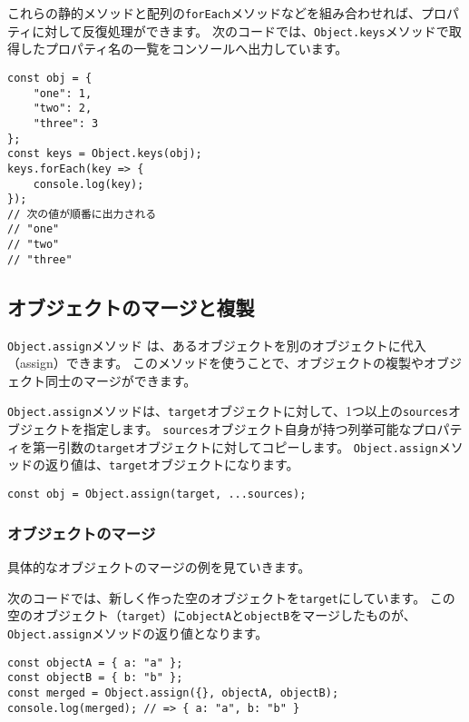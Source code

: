 これらの静的メソッドと配列の\texttt{forEach}メソッドなどを組み合わせれば、プロパティに対して反復処理ができます。
次のコードでは、\texttt{Object.keys}メソッドで取得したプロパティ名の一覧をコンソールへ出力しています。

\begin{lstlisting}
const obj = {
    "one": 1,
    "two": 2,
    "three": 3
};
const keys = Object.keys(obj);
keys.forEach(key => {
    console.log(key);
});
// 次の値が順番に出力される
// "one"
// "two"
// "three"
\end{lstlisting}

\hypertarget{copy-and-merge}{%
\subsection{オブジェクトのマージと複製}\label{copy-and-merge}}

\texttt{Object.assign}メソッド\,\protect{}\,は、あるオブジェクトを別のオブジェクトに代入（assign）できます。
このメソッドを使うことで、オブジェクトの複製やオブジェクト同士のマージができます。

\texttt{Object.assign}メソッドは、\texttt{target}オブジェクトに対して、1つ以上の\texttt{sources}オブジェクトを指定します。
\texttt{sources}オブジェクト自身が持つ列挙可能なプロパティを第一引数の\texttt{target}オブジェクトに対してコピーします。
\texttt{Object.assign}メソッドの返り値は、\texttt{target}オブジェクトになります。

\begin{lstlisting}
const obj = Object.assign(target, ...sources);
\end{lstlisting}

\hypertarget{merge}{%
\subsubsection{オブジェクトのマージ}\label{merge}}

具体的なオブジェクトのマージの例を見ていきます。

次のコードでは、新しく作った空のオブジェクトを\texttt{target}にしています。
この空のオブジェクト（\texttt{target}）に\texttt{objectA}と\texttt{objectB}をマージしたものが、\texttt{Object.assign}メソッドの返り値となります。

\begin{lstlisting}
const objectA = { a: "a" };
const objectB = { b: "b" };
const merged = Object.assign({}, objectA, objectB);
console.log(merged); // => { a: "a", b: "b" }
\end{lstlisting}

